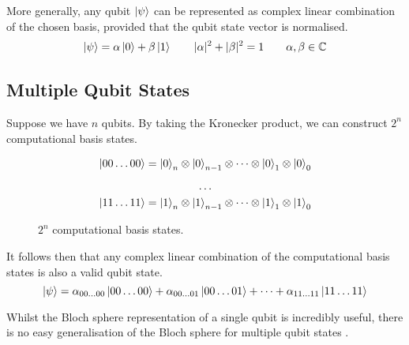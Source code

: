 More generally, any qubit $\ket\psi$ can be represented as complex linear combination of the chosen basis, provided that the qubit state vector is normalised.
\begin{equation*}
\begin{gathered}
    \ket \psi = \alpha\ket 0 + \beta\ket 1 \qquad
    |\alpha|^2 + |\beta|^2 = 1 \qquad
    \alpha, \beta \in \mathbb{C}
\end{gathered}
\end{equation*}

\subsection{Multiple Qubit States}
Suppose we have $n$ qubits. By taking the Kronecker product, we can construct $2^n$ computational basis states.
\begin{figure}[H]
\centering
\begin{gather*}
\ket{00 \dots 00} =
\ket{0}_n \otimes \ket{0}_{n-1} \otimes \dots
\otimes \ket{0}_1 \otimes \ket{0}_0 \\[1ex]
%
\dots \\
%
\ket{11 \dots 11} =
\ket{1}_n \otimes \ket{1}_{n-1} \otimes \dots
\otimes \ket{1}_1 \otimes \ket{1}_0
\end{gather*}
\caption{$2^n$ computational basis states.}
\end{figure}

It follows then that any complex linear combination of the computational basis states is also a valid qubit state.
\begin{equation*}
\ket\psi =
\alpha_{00 \dots 00}\ket{00 \dots 00} +
\alpha_{00 \dots 01}\ket{00 \dots 01} +
\dots +
\alpha_{11 \dots 11}\ket{11 \dots 11}
\end{equation*}

Whilst the Bloch sphere representation of a single qubit is incredibly useful, there is no easy generalisation of the Bloch sphere for multiple qubit states \cite{Nielsen2012}.
